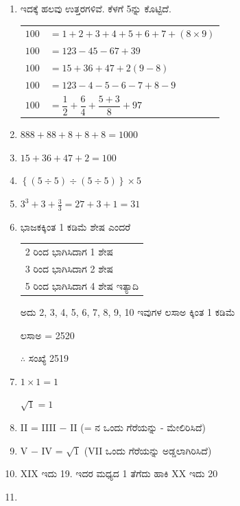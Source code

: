 \begin{enumerate}
\itemsep=5pt
\item ಇದಕ್ಕೆ ಹಲವು ಉತ್ತರಗಳಿವೆ. ಕೆಳಗೆ 5ನ್ನು ಕೊಟ್ಟಿದೆ.

\begin{tabular}{ll}
$100$ & $= 1 + 2 + 3 + 4 + 5 + 6 + 7 + (8 \times 9)$\\[0.1cm]
$100$ & $= 123 - 45 - 67 + 39$\\[0.1cm]
$100$ & $= 15 + 36 + 47 + 2 (9 - 8)$\\[0.1cm]
$100$ & $= 123 - 4 - 5 - 6 - 7 + 8 - 9$\\ [0.1cm]
$100$ & $= \dfrac{1}{2} + \dfrac{6}{4} + \dfrac{5 + 3}{8} + 97$
\end{tabular}

\smallskip
\item $888 + 88 + 8 + 8 + 8 = 1000$

\item $15 + 36 + 47 + 2 = 100$

\item $\left\{(5 \div 5) \div (5 \div 5)\right\} \times 5$

\item $3^{3} + 3 + \frac{3}{3} = 27 + 3 + 1 = 31$

\item ಭಾಜಕಕ್ಕಿಂತ 1 ಕಡಿಮೆ ಶೇಷ ಎಂದರೆ 

\begin{tabular}{l}
2 ರಿಂದ ಭಾಗಿಸಿದಾಗ 1 ಶೇಷ\\
3 ರಿಂದ ಭಾಗಿಸಿದಾಗ 2 ಶೇಷ\\
5 ರಿಂದ ಭಾಗಿಸಿದಾಗ 4 ಶೇಷ ಇತ್ಯಾದಿ
\end{tabular}

\smallskip
ಅದು 2, 3, 4, 5, 6, 7, 8, 9, 10 ಇವುಗಳ ಲಸಾಅ ಕ್ಕಿಂತ 1 ಕಡಿಮೆ 

\quad ಲಸಾಅ = 2520

$\therefore$ ಸಂಖ್ಯೆ  2519

\item $1 \times 1 = 1$

$\sqrt{1} = 1$

\item II = IIII $-$ II (= ನ ಒಂದು ಗೆರೆಯನ್ನು - ಮೇಲಿರಿಸಿದೆ)

\item V $-$ IV = $\sqrt{1}$ (VII ಒಂದು ಗೆರೆಯನ್ನು ಅಡ್ಡಲಾಗಿರಿಸಿದೆ)

\item XIX ಇದು 19. ಇದರ ಮಧ್ಯದ 1 ತೆಗೆದು ಹಾಕಿ XX ಇದು 20

\item 
~


\end{enumerate}
